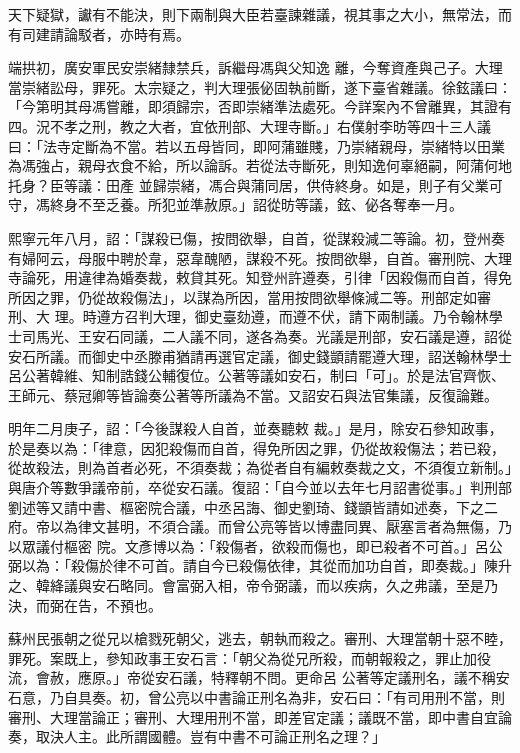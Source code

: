 
\begin{pinyinscope}

 天下疑獄，讞有不能決，則下兩制與大臣若臺諫雜議，視其事之大小，無常法，而有司建請論駁者，亦時有焉。



 端拱初，廣安軍民安崇緒隸禁兵，訴繼母馮與父知逸
 離，今奪資產與己子。大理當崇緒訟母，罪死。太宗疑之，判大理張佖固執前斷，遂下臺省雜議。徐鉉議曰：「今第明其母馮嘗離，即須歸宗，否即崇緒準法處死。今詳案內不曾離異，其證有四。況不孝之刑，教之大者，宜依刑部、大理寺斷。」右僕射李昉等四十三人議曰：「法寺定斷為不當。若以五母皆同，即阿蒲雖賤，乃崇緒親母，崇緒特以田業為馮強占，親母衣食不給，所以論訴。若從法寺斷死，則知逸何辜絕嗣，阿蒲何地托身？臣等議：田產
 並歸崇緒，馮合與蒲同居，供侍終身。如是，則子有父業可守，馮終身不至乏養。所犯並準赦原。」詔從昉等議，鉉、佖各奪奉一月。



 熙寧元年八月，詔：「謀殺已傷，按問欲舉，自首，從謀殺減二等論。初，登州奏有婦阿云，母服中聘於韋，惡韋醜陋，謀殺不死。按問欲舉，自首。審刑院、大理寺論死，用違律為婚奏裁，敕貸其死。知登州許遵奏，引律「因殺傷而自首，得免所因之罪，仍從故殺傷法」，以謀為所因，當用按問欲舉條減二等。刑部定如審刑、大
 理。時遵方召判大理，御史臺劾遵，而遵不伏，請下兩制議。乃令翰林學士司馬光、王安石同議，二人議不同，遂各為奏。光議是刑部，安石議是遵，詔從安石所議。而御史中丞滕甫猶請再選官定議，御史錢顗請罷遵大理，詔送翰林學士呂公著韓維、知制誥錢公輔復位。公著等議如安石，制曰「可」。於是法官齊恢、王師元、蔡冠卿等皆論奏公著等所議為不當。又詔安石與法官集議，反復論難。



 明年二月庚子，詔：「今後謀殺人自首，並奏聽敕
 裁。」是月，除安石參知政事，於是奏以為：「律意，因犯殺傷而自首，得免所因之罪，仍從故殺傷法；若已殺，從故殺法，則為首者必死，不須奏裁；為從者自有編敕奏裁之文，不須復立新制。」與唐介等數爭議帝前，卒從安石議。復詔：「自今並以去年七月詔書從事。」判刑部劉述等又請中書、樞密院合議，中丞呂誨、御史劉琦、錢顗皆請如述奏，下之二府。帝以為律文甚明，不須合議。而曾公亮等皆以博盡同異、厭塞言者為無傷，乃以眾議付樞密
 院。文彥博以為：「殺傷者，欲殺而傷也，即已殺者不可首。」呂公弼以為：「殺傷於律不可首。請自今已殺傷依律，其從而加功自首，即奏裁。」陳升之、韓絳議與安石略同。會富弼入相，帝令弼議，而以疾病，久之弗議，至是乃決，而弼在告，不預也。



 蘇州民張朝之從兄以槍戮死朝父，逃去，朝執而殺之。審刑、大理當朝十惡不睦，罪死。案既上，參知政事王安石言：「朝父為從兄所殺，而朝報殺之，罪止加役流，會赦，應原。」帝從安石議，特釋朝不問。更命呂
 公著等定議刑名，議不稱安石意，乃自具奏。初，曾公亮以中書論正刑名為非，安石曰：「有司用刑不當，則審刑、大理當論正；審刑、大理用刑不當，即差官定議；議既不當，即中書自宜論奏，取決人主。此所謂國體。豈有中書不可論正刑名之理？」




\end{pinyinscope}
